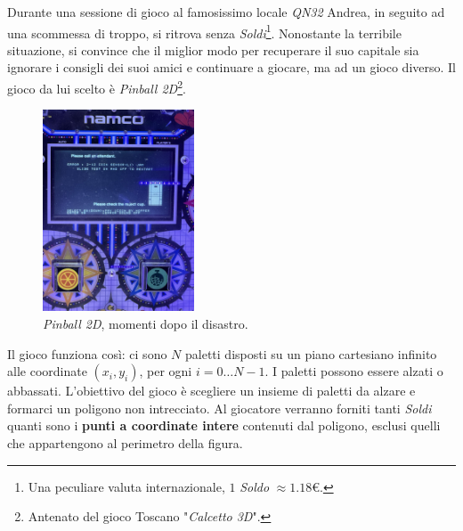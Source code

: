 \usepackage{xcolor}
\usepackage{afterpage}
\usepackage{pifont,mdframed}
\usepackage[bottom]{footmisc}
\usepackage{minted}

\newcommand{\inputfile}{\texttt{stdin}}
\newcommand{\outputfile}{\texttt{stdout}}
\makeatletter
\renewcommand{\this@inputfilename}{\texttt{stdin}}
\renewcommand{\this@outputfilename}{\texttt{stdout}}
\renewcommand{\this@syllabuslevel}{5}
\renewcommand{\this@custdifficulty}{3}
\makeatother

Durante una sessione di gioco al famosissimo locale \textit{QN32} Andrea, in seguito ad una scommessa di troppo,
si ritrova senza \textit{Soldi}\footnote[1]{Una peculiare valuta internazionale, $1$ \textit{Soldo} $\approx 1.18$€.}.
Nonostante la terribile situazione, si convince che il miglior modo per recuperare il suo capitale sia
ignorare i consigli dei suoi amici e continuare a giocare, ma ad un gioco diverso.
Il gioco da lui scelto è \textit{Pinball 2D}\footnote[2]{Antenato del gioco Toscano "\textit{Calcetto 3D}".}.

\begin{figure}[h]
    \centering
    \includegraphics[width=0.4\textwidth]{./broken.jpg}
    \caption{\textit{Pinball 2D}, momenti dopo il disastro.}
\end{figure}

Il gioco funziona così: ci sono $N$ paletti disposti su un piano cartesiano infinito alle coordinate $(x_i, y_i)$, per ogni $i = 0\dots N-1$.
I paletti possono essere alzati o abbassati. L'obiettivo del gioco è scegliere un insieme di paletti da alzare
e formarci un poligono non intrecciato. Al giocatore verranno forniti tanti \textit{Soldi} quanti sono i \textbf{punti a coordinate intere}
contenuti dal poligono, esclusi quelli che appartengono al perimetro della figura.


